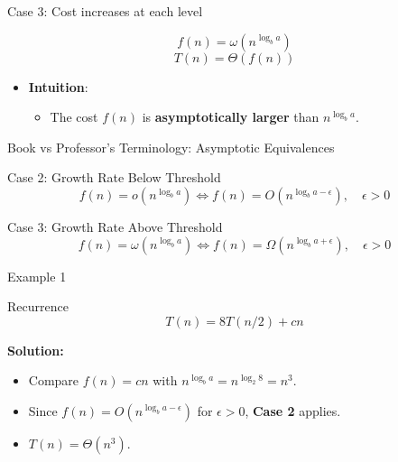 \begin{frame}{Case 3: Cost increases at each level}

\begin{block}{}
\[
f(n) = \omega(n^{\log_b a})
\]
\[
T(n) = \Theta(f(n))
\]
\end{block}

\begin{itemize}
    \item \textbf{Intuition}:
    \begin{itemize}
        \item The cost \( f(n) \) is \textbf{asymptotically larger} than \( n^{\log_b a} \).

    \end{itemize}
\end{itemize}

\end{frame}
\begin{frame}{Book vs Professor's Terminology: Asymptotic Equivalences}

  \begin{block}{Case 2: Growth Rate Below Threshold}
    \[
    f(n) = o(n^{\log_b a}) \iff f(n) = O(n^{\log_b{a-\epsilon}}), \quad \epsilon > 0
    \]
  \end{block}

  \vspace{0.5cm}

  \begin{block}{Case 3: Growth Rate Above Threshold}
    \[
    f(n) = \omega(n^{\log_b a}) \iff f(n) = \Omega(n^{\log_b{a+\epsilon}}), \quad \epsilon > 0
    \]
  \end{block}

\end{frame}


\begin{frame}{Example 1}
  \begin{block}{Recurrence}
\[
T(n) = 8T(n/2) + cn
\]
  \end{block}

\textbf{Solution:}
\begin{itemize}
    \item Compare \( f(n) = cn \) with \( n^{\log_b a} = n^{\log_2 8} = n^3 \).
    \item Since \( f(n) = O(n^{\log_b a - \epsilon}) \) for \( \epsilon > 0 \), \textbf{Case 2} applies.
    \item \( T(n) = \Theta(n^3) \).
\end{itemize}
\end{frame}

